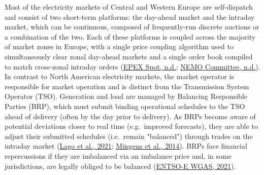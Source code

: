 \documentclass[12pt,a4paper,]{report}
\begin{document}
Most of the electricity markets of Central and Western Europe are
self-dispatch and consist of two short-term platforms: the day-ahead
market and the intraday market, which can be continuous, composed of
frequently-run discrete auctions or a combination of the two. Each of
these platforms is coupled across the majority of market zones in
Europe, with a single price coupling algorithm used to simultaneously
clear zonal day-ahead markets and a single order book compiled to match
cross-zonal intraday orders
(\protect\hyperlink{ref-epexspotEuropeanMarketCoupling}{EPEX Spot,
n.d.}; \protect\hyperlink{ref-nemocommitteeSingleIntradayCoupling}{NEMO
Committee, n.d.}). In contrast to North American electricity markets,
the market operator is responsible for market operation and is distinct
from the Transmission System Operator (TSO). Generation and load are
managed by Balancing Responsible Parties (BRP), which must submit
binding operational schedules to the TSO ahead of delivery (often by the
day prior to delivery). As BRPs become aware of potential deviations
closer to real time (e.g.~improved forecasts), they are able to adjust
their submitted schedules (i.e.~remain "balanced") through trades on the
intraday market
(\protect\hyperlink{ref-lagoMarketFrameworkGrid2021}{Lago et al., 2021};
\protect\hyperlink{ref-musgensEconomicsDesignBalancing2014}{Müsgens et
al., 2014}). BRPs face financial repercussions if they are imbalanced
via an imbalance price and, in some jurisdictions, are legally obliged
to be balanced
(\protect\hyperlink{ref-entso-ewgasSurveyAncillaryServices2021}{ENTSO-E
WGAS, 2021}).
\end{document}
